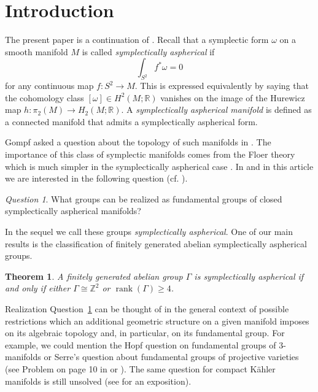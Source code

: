 \documentclass[12pt]{amsart}
\newtheorem{theorem}[subsection]{Theorem}%
\theoremstyle{definition}
\theoremstyle{remark}
\newtheorem{question}[subsection]{Question}
\numberwithin{figure}{section}
\numberwithin{table}{section}
\numberwithin{equation}{section}
\def\m{\medskip}
\newcommand{\Ga}{{\Gamma}}
\newcommand\rank{\operatorname{rank}}
\begin{document}
 


\section{Introduction}\label{S:intro} 
 
The present paper is a continuation of \cite{IKRT}. 
Recall that a symplectic form $\omega$ on a smooth  manifold $M$ is called
{\em symplectically aspherical} if 
$$
\int_{S^2}f^*\omega=0
$$
for any continuous map $f: S^2\rightarrow M$. 
This is expressed equivalently by saying that the cohomology class 
$[\omega]\in H^2(M;\mathbb{R})$ vanishes on the image of the Hurewicz map 
$h: \pi_2(M)\rightarrow H_2(M;\mathbb{R})$. A {\em symplectically aspherical manifold} is defined as a connected manifold that admits a symplectically aspherical form.

Gompf asked a question about the topology of such manifolds 
in \cite{G2}. The importance of this class of symplectic manifolds
comes from the Floer theory  which is much simpler in the
symplectically aspherical case \cite{F, S}. 
In \cite{IKRT} and in this article we are interested in the 
following question (cf. \cite{G2}).

\begin{question}\label{q:real}
What groups can be realized as fundamental groups of closed
symplectically aspherical manifolds?
\end{question}

In the sequel we call these groups {\it symplectically aspherical}.
One of our main results is the classification of finitely generated
abelian symplectically aspherical groups.

\begin{theorem}\label{T:abel}
A finitely generated abelian group $\Gamma $ is symplectically aspherical
if and only if either $\Gamma \cong \mathbb Z^2$ or $\rank(\Ga)\geq 4$.
\end{theorem}








\m
Realization Question~\ref{q:real} can be thought of in the general
context of possible restrictions 
which  an additional geometric structure on a given manifold imposes on its
algebraic topology and, in particular, on its fundamental group. 
For example, we could mention the Hopf question on fundamental groups of
3-manifolds or Serre's question about fundamental groups of 
projective varieties (see Problem on page 10 in \cite{Se} or
\cite[Open Problem 1.17]{ABCKT}). 
The same question for compact K\"ahler manifolds is still 
unsolved (see \cite{ABCKT} for an exposition). 
\end{document}
